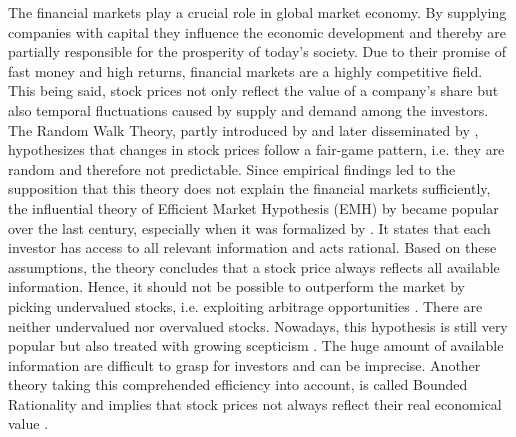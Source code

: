 
The financial markets play a crucial role in global market economy. By supplying companies with capital they influence the economic development and thereby are partially responsible for the prosperity of today's society. Due to their promise of fast money and high returns, financial markets are a highly competitive field. This being said, stock prices not only reflect the value of a company's share but also temporal fluctuations caused by supply and demand among the investors. The Random Walk Theory, partly introduced by \citet{Regnault1863CalculBourse} and later disseminated by \citet{Malkiel1973AStreet}, hypothesizes that changes in stock prices follow a fair-game pattern, i.e. they are random and therefore not predictable. Since empirical findings led to the supposition that this theory does not explain the financial markets sufficiently, the influential theory of Efficient Market Hypothesis (EMH) by \citet{Bachelier1900TheorySpeculation} became popular over the last century, especially when it was formalized by \citet{Fama1965RandomPrices}. It states that each investor has access to all relevant information and acts rational. Based on these assumptions, the theory concludes that a stock price always reflects all available information. Hence, it should not be possible to outperform the market by picking undervalued stocks, i.e. exploiting arbitrage opportunities \cite{Franke2010StatisticsMarkets}. There are neither undervalued nor overvalued stocks. Nowadays, this hypothesis is still very popular but also treated with growing scepticism \cite{Hsu2016BridgingEconomists, KhadjehNassirtoussi2014TextReview, Yoo2005MachineEvaluation}. The huge amount of available information are difficult to grasp for investors and can be imprecise. Another theory taking this comprehended efficiency into account, is called Bounded Rationality \cite{Simon1955AChoice} and implies that stock prices not always reflect their real economical value \cite{Hsu2016BridgingEconomists}.




